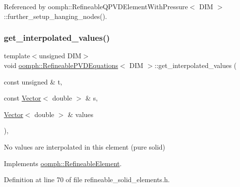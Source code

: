 Referenced by oomph\+::\+Refineable\+Q\+P\+V\+D\+Element\+With\+Pressure$<$ D\+I\+M $>$\+::further\+\_\+setup\+\_\+hanging\+\_\+nodes().

\mbox{\label{classoomph_1_1RefineablePVDEquations_a94defe5e7d281500b191d8bae6cfb2f1}} 
\subsubsection{\texorpdfstring{get\+\_\+interpolated\+\_\+values()}{get\_interpolated\_values()}\hspace{0.1cm}{\footnotesize\ttfamily [1/2]}}
{\footnotesize\ttfamily template$<$unsigned D\+IM$>$ \\
void \hyperlink{classoomph_1_1RefineablePVDEquations}{oomph\+::\+Refineable\+P\+V\+D\+Equations}$<$ D\+IM $>$\+::get\+\_\+interpolated\+\_\+values (\begin{DoxyParamCaption}\item[{const unsigned \&}]{t,  }\item[{const \hyperlink{classoomph_1_1Vector}{Vector}$<$ double $>$ \&}]{s,  }\item[{\hyperlink{classoomph_1_1Vector}{Vector}$<$ double $>$ \&}]{values }\end{DoxyParamCaption})\hspace{0.3cm}{\ttfamily [inline]}, {\ttfamily [virtual]}}



No values are interpolated in this element (pure solid) 



Implements \hyperlink{classoomph_1_1RefineableElement_ada6f0efe831ffefb1d2829ce01d45bfc}{oomph\+::\+Refineable\+Element}.



Definition at line 70 of file refineable\+\_\+solid\+\_\+elements.\+h.

\mbox{\label{classoomph_1_1RefineablePVDEquations_a2e49057699c62727015cdbf1343be157}} 
